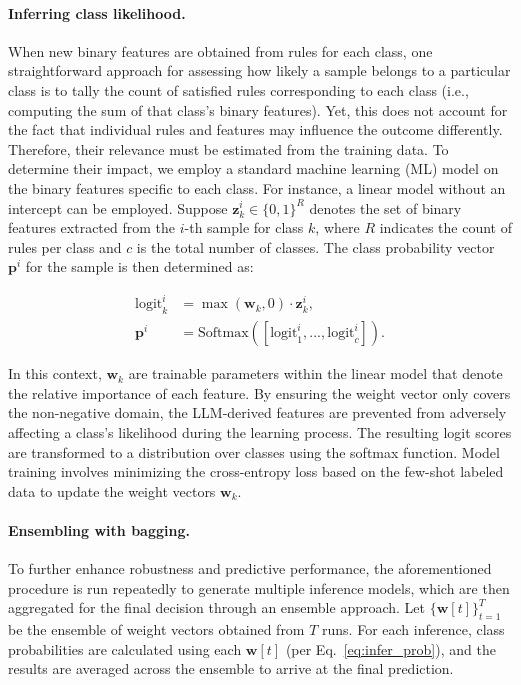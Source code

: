 \vspace*{-0.12in}
\paragraph{Inferring class likelihood.} When new binary features are obtained from rules for each class, one straightforward approach for assessing how likely a sample belongs to a particular class is to tally the count of satisfied rules corresponding to each class (i.e., computing the sum of that class's binary features). Yet, this does not account for the fact that individual rules and features may influence the outcome differently. Therefore, their relevance must be estimated from the training data. To determine their impact, we employ a standard machine learning (ML) model on the binary features specific to each class. For instance, a linear model without an intercept can be employed. Suppose $\mathbf{z}_k^i \in \{0, 1\}^R$ denotes the set of binary features extracted from the $i$-th sample for class $k$, where $R$ indicates the count of rules per class and $c$ is the total number of classes. The class probability vector $\mathbf{p}^i$ for the sample is then determined as:

\begin{align}
\text{logit}_k^i &= \max(\mathbf{w}_k, 0) \cdot \mathbf{z}_k^i, \nonumber \\
\mathbf{p}^i &= \text{Softmax}({[\text{logit}_{1}^i, ..., \text{logit}_{c}^i]}). \label{eq:infer_prob}
\end{align}

In this context, $\mathbf{w}_k$ are trainable parameters within the linear model that denote the relative importance of each feature. By ensuring the weight vector only covers the non-negative domain, the LLM-derived features are prevented from adversely affecting a class's likelihood during the learning process. The resulting logit scores are transformed to a distribution over classes using the softmax function. Model training involves minimizing the cross-entropy loss based on the few-shot labeled data to update the weight vectors $\mathbf{w}_k$.

\vspace*{-0.12in}
\paragraph{Ensembling with bagging.} To further enhance robustness and predictive performance, the aforementioned procedure is run repeatedly to generate multiple inference models, which are then aggregated for the final decision through an ensemble approach. Let $\{\mathbf{w}[t]\}_{t=1}^T$ be the ensemble of weight vectors obtained from $T$ runs. For each inference, class probabilities are calculated using each $\mathbf{w}[t]$ (per Eq.~\ref{eq:infer_prob}), and the results are averaged across the ensemble to arrive at the final prediction.

